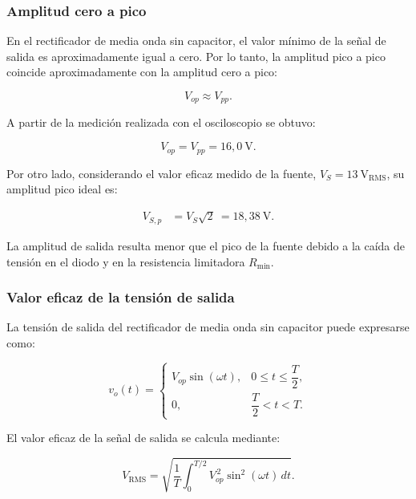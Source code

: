 \subsubsection{Amplitud cero a pico}

En el rectificador de media onda sin capacitor, el valor mínimo de la señal de salida es aproximadamente igual a cero. Por lo tanto, la amplitud pico a pico coincide aproximadamente con la amplitud cero a pico:

\begin{equation}
    V_{op}\approx V_{pp}.
\end{equation}

A partir de la medición realizada con el osciloscopio se obtuvo:

\begin{equation}
    V_{op}=V_{pp}=16{,}0\ \mathrm{V}.
\end{equation}

Por otro lado, considerando el valor eficaz medido de la fuente, $V_S=13\ \mathrm{V_{RMS}}$, su amplitud pico ideal es:

\begin{align*}
    V_{S,p}
    &=V_S\sqrt{2}\ =18{,}38\ \mathrm{V}.
\end{align*}

La amplitud de salida resulta menor que el pico de la fuente debido a la caída de tensión en el diodo y en la resistencia limitadora $R_{\min}$.

\subsubsection{Valor eficaz de la tensión de salida}

La tensión de salida del rectificador de media onda sin capacitor puede expresarse como:

\begin{equation}
    v_o(t)=
    \begin{cases}
        V_{op}\sin(\omega t),
        & 0\leq t\leq \dfrac{T}{2},\\[6pt]
        0,
        & \dfrac{T}{2}<t<T.
    \end{cases}
\end{equation}

El valor eficaz de la señal de salida se calcula mediante:

\begin{equation}
    V_{\mathrm{RMS}}
    =
    \sqrt{
        \frac{1}{T}
        \int_0^{T/2}
        V_{op}^{\,2}\sin^2(\omega t)\,dt
    }.
\end{equation}

